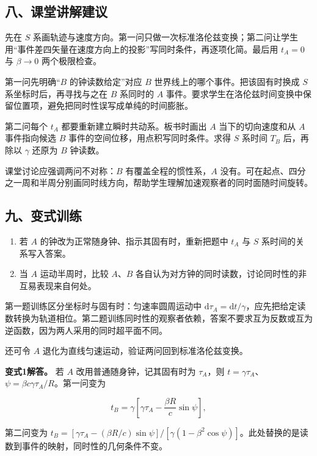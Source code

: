 \documentclass[12pt,a4paper,UTF8]{ctexart}
\newcommand{\tightlist}{\setlength{\itemsep}{0pt}\setlength{\parskip}{0pt}}
\begin{document}
\subsection{八、课堂讲解建议}\label{ux516bux8bfeux5802ux8bb2ux89e3ux5efaux8bae-6}

先在 \(S\)
系画轨迹与速度方向。第一问只做一次标准洛伦兹变换；第二问让学生用``事件差四矢量在速度方向上的投影''写同时条件，再逐项化简。最后用
\(t_A=0\) 与 \(\beta\to0\) 两个极限检查。

第一问先明确``\(B\) 的钟读数给定''对应 \(B\)
世界线上的哪个事件。把该固有时换成 \(S\) 系坐标时后，再寻找与之在 \(B\)
系同时的 \(A\)
事件。要求学生在洛伦兹时间变换中保留位置项，避免把同时性误写成单纯的时间膨胀。

第二问每个 \(t_A\) 都要重新建立瞬时共动系。板书时画出 \(A\)
当下的切向速度和从 \(A\) 事件指向候选 \(B\)
事件的空间位移，用点积写同时条件。求得 \(S\) 系时间 \(T_B\) 后，再除以
\(\gamma\) 还原为 \(B\) 钟读数。

课堂讨论应强调两问不对称：\(B\) 有覆盖全程的惯性系，\(A\)
没有。可在起点、四分之一周和半周分别画同时线方向，帮助学生理解加速观察者的同时面随时间旋转。

\subsection{九、变式训练}\label{ux4e5dux53d8ux5f0fux8badux7ec3-6}

\begin{enumerate}
\def\labelenumi{\arabic{enumi}.}
\tightlist
\item
  若 \(A\) 的钟改为正常随身钟、指示其固有时，重新把题中 \(t_A\) 与 \(S\)
  系时间的关系写入答案。
\item
  当 \(A\) 运动半周时，比较 \(A\)、\(B\)
  各自认为对方钟的同时读数，讨论同时性的非互易表现来自何处。
\end{enumerate}

第一题训练区分坐标时与固有时：匀速率圆周运动中
\(\mathrm d\tau_A=\mathrm dt/\gamma\)，应先把给定读数转换为轨道相位。第二题训练同时性的观察者依赖，答案不要求互为反数或互为逆函数，因为两人采用的同时超平面不同。

还可令 \(A\) 退化为直线匀速运动，验证两问回到标准洛伦兹变换。

\textbf{变式1解答。} 若 \(A\) 改用普通随身钟，记其固有时为
\(\tau_A\)，则
\(t=\gamma\tau_A\)、\(\psi=\beta c\gamma\tau_A/R\)。第一问变为

\[t_B=\gamma\left[\gamma\tau_A-\frac{\beta R}{c}\sin\psi\right],\]

第二问变为
\(t_B=[\gamma\tau_A-(\beta R/c)\sin\psi]/[\gamma(1-\beta^2\cos\psi)]\)。此处替换的是读数到事件的映射，同时性的几何条件不变。
\end{document}
